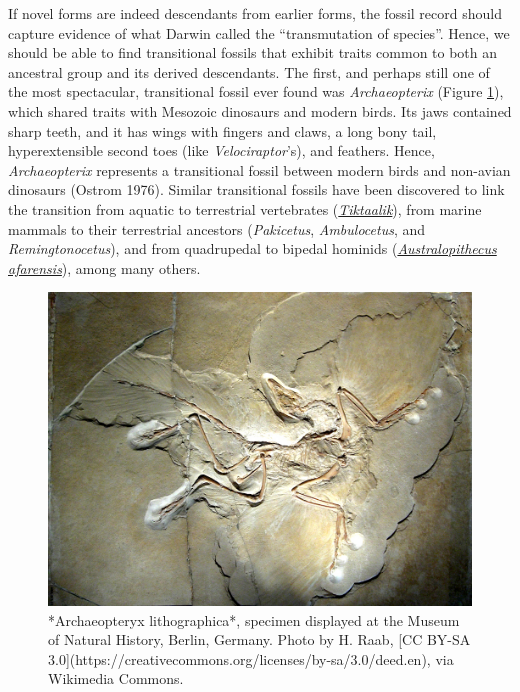 \documentclass[
]{book}
\begin{document}
If novel forms are indeed descendants from earlier forms, the fossil record should capture evidence of what Darwin called the ``transmutation of species''. Hence, we should be able to find transitional fossils that exhibit traits common to both an ancestral group and its derived descendants. The first, and perhaps still one of the most spectacular, transitional fossil ever found was \emph{Archaeopterix} (Figure \ref{fig:archaeopteryx}), which shared traits with Mesozoic dinosaurs and modern birds. Its jaws contained sharp teeth, and it has wings with fingers and claws, a long bony tail, hyperextensible second toes (like \emph{Velociraptor}'s), and feathers. Hence, \emph{Archaeopterix} represents a transitional fossil between modern birds and non-avian dinosaurs (Ostrom 1976). Similar transitional fossils have been discovered to link the transition from aquatic to terrestrial vertebrates (\protect\hyperlink{tiktaalik}{\emph{Tiktaalik}}), from marine mammals to their terrestrial ancestors (\emph{Pakicetus}, \emph{Ambulocetus}, and \emph{Remingtonocetus}), and from quadrupedal to bipedal hominids (\href{human-origins-and-human-mediated-evolution.html}{\emph{Australopithecus afarensis}}), among many others.

\begin{figure}
\includegraphics[width=1\linewidth]{images/Archaeopteryx_lithographica} \caption{*Archaeopteryx lithographica*, specimen displayed at the Museum of Natural History, Berlin, Germany. Photo by H. Raab, [CC BY-SA 3.0](https://creativecommons.org/licenses/by-sa/3.0/deed.en), via Wikimedia Commons.}\label{fig:archaeopteryx}
\end{figure}
\end{document}
